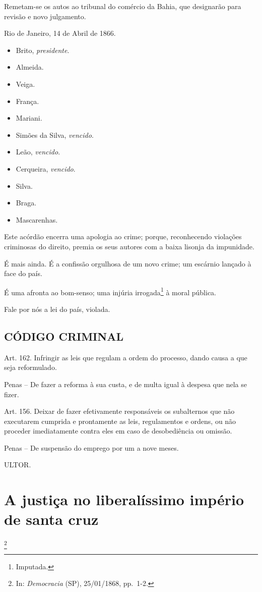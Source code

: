 Remetam-se os autos ao tribunal do comércio da Bahia, que designarão
para revisão e novo julgamento.

Rio de Janeiro, 14 de Abril de 1866.

\begin{itemize}
\tightlist
\item
  Brito, \emph{presidente}.
\item
  Almeida.
\item
  Veiga.
\item
  França.
\item
  Mariani.
\item
  Simões da Silva, \emph{vencido}.
\item
  Leão, \emph{vencido}.
\item
  Cerqueira, \emph{vencido}.
\item
  Silva.
\item
  Braga.
\item
  Mascarenhas.
\end{itemize}

Este acórdão encerra uma apologia ao crime; porque, reconhecendo
violações criminosas do direito, premia os seus autores com a baixa
lisonja da impunidade.

É mais ainda. É a confissão orgulhosa de um novo crime; um escárnio
lançado à face do país.

É uma afronta ao bom-senso; uma injúria irrogada\footnote{Imputada.} à
moral pública.

Fale por nós a lei do país, violada.

\section{CÓDIGO CRIMINAL}

Art. 162. Infringir as leis que regulam a ordem do processo, dando causa
a que seja reformulado.

Penas -- De fazer a reforma à sua custa, e de multa igual à despesa que
nela se fizer.

Art. 156. Deixar de fazer efetivamente responsáveis os subalternos que
não executarem cumprida e prontamente as leis, regulamentos e ordens, ou
não proceder imediatamente contra eles em caso de desobediência ou
omissão.

Penas -- De suspensão do emprego por um a nove meses.

ULTOR.

\chapter{A justiça no liberalíssimo império de santa cruz}\footnote{In:
  \emph{Democracia} (SP), 25/01/1868, pp.~1-2.}

